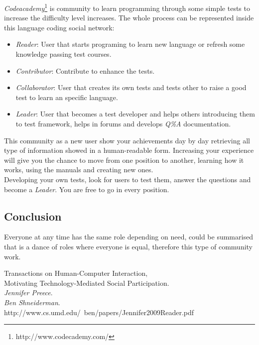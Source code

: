 \documentclass[11pt]{scrartcl}
\begin{document}
    \emph{Codeacademy}\footnote{http://www.codecademy.com/} is community to learn programming through some simple tests to increase the difficulty level increases. The whole process can be represented inside this language coding social network:

	\begin{itemize}
	
		\item \emph{Reader}: User that starts programing to learn new language or refresh some knowledge passing test courses.
		\item \emph{Contributor}: Contribute to enhance the tests.
		\item \emph{Collaborator}: User that creates its own tests and tests other to raise a good test to learn an specific language.
		\item \emph{Leader}: User that becomes a test developer and helps others introducing them to test framework, helps in forums and develops \emph{Q\%A} documentation.
	\end{itemize}
	
	This community as a new user show your achievements day by day retrieving all type of information showed in a human-readable form. Increasing your experience will give you the chance to move from one position to another, learning how it works, using the manuals and creating new ones.\\
	
	Developing your own tests, look for users to test them, answer the questions and become a \emph{Leader}. You are free to go in every position.
	
	\subsection{Conclusion}
	
	Everyone at any time has the same role depending on need, could be summarised that is a dance of roles where everyone is equal, therefore this type of community work.
	

\begin{thebibliography}{9}
	
		Transactions on Human-Computer Interaction,\\
		Motivating Technology-Mediated Social Participation.\\
		\emph{Jennifer Preece}.\\
		\emph{Ben Shneiderman}.\\
		http://www.cs.umd.edu/~ben/papers/Jennifer2009Reader.pdf
\end{thebibliography}
\end{document}
